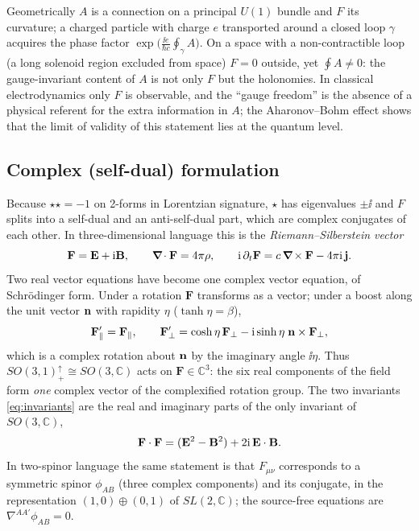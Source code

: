 \begin{remark}
Geometrically $A$ is a connection on a principal $U(1)$ bundle and $F$
its curvature; a charged particle with charge $e$ transported around a
closed loop $\gamma$ acquires the phase factor $\exp\!\big(\tfrac{\ii e}{\hbar c}\oint_\gamma A\big)$.  On a space with a non-contractible loop (a long solenoid
region excluded from space) $F=0$ outside, yet $\oint A\neq0$: the
gauge-invariant content of $A$ is not only $F$ but the holonomies.  In
classical electrodynamics only $F$ is observable, and the ``gauge
freedom'' is the absence of a physical referent for the extra
information in $A$; the Aharonov--Bohm effect shows that the limit of
validity of this statement lies at the quantum level.
\end{remark}

\subsection{Complex (self-dual) formulation}

Because $\star\star=-1$ on 2-forms in Lorentzian signature, $\star$ has
eigenvalues $\pm\ii$ and $F$ splits into a self-dual and an anti-self-dual
part, which are complex conjugates of each other.  In three-dimensional
language this is the \emph{Riemann--Silberstein vector}
\begin{equation}\label{eq:RS}
\mathbf F=\mathbf{E}+\mathrm{i}\mathbf{B},\qquad
\boldsymbol{\nabla}\!\cdot\mathbf F=4\pi\rho,\qquad
\mathrm{i}\,\partial_t\mathbf F=c\,\boldsymbol{\nabla}\!\times\mathbf F-4\pi\mathrm{i}\,\mathbf{j} .
\end{equation}
Two real vector equations have become one complex vector equation, of
Schr\"odinger form.  Under a rotation $\mathbf F$ transforms as a
vector; under a boost along the unit vector $\mathbf{n}$ with rapidity
$\eta$ ($\tanh\eta=\beta$),
\begin{equation}
\mathbf F'_\parallel=\mathbf F_\parallel,\qquad
\mathbf F'_\perp=\cosh\eta\,\mathbf F_\perp-\mathrm{i}\sinh\eta\;\mathbf{n}\times\mathbf F_\perp ,
\end{equation}
which is a complex rotation about $\mathbf{n}$ by the imaginary angle $\ii\eta$.
Thus $SO(3,1)^\uparrow_+\cong SO(3,\mathbb C)$ acts on $\mathbf F\in\mathbb C^3$:
the six real components of the field form \emph{one} complex vector of the
complexified rotation group.  The two invariants \eqref{eq:invariants}
are the real and imaginary parts of the only invariant of
$SO(3,\mathbb C)$,
\begin{equation}
\mathbf F\cdot\mathbf F=(\mathbf{E}^2-\mathbf{B}^2)+2\mathrm{i}\,\mathbf{E}\cdot\mathbf{B} .
\end{equation}
In two-spinor language the same statement is that $F_{\mu\nu}$
corresponds to a symmetric spinor $\phi_{AB}$ (three complex components)
and its conjugate, in the representation $(1,0)\oplus(0,1)$ of
$SL(2,\mathbb C)$; the source-free equations are $\nabla^{AA'}\phi_{AB}=0$.

